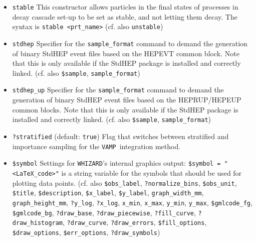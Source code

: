 \documentclass[12pt]{book}
\newcommand{\ttt}[1]{\texttt{#1}}
\newcommand{\whizard}{\texttt{WHIZARD}}
\newcommand{\vamp}{\texttt{VAMP}}
\begin{document}
\begin{itemize}
can be one of the following \ttt{eV}, \ttt{keV}, \ttt{MeV}, \ttt{GeV},
and \ttt{TeV}. If absent, \whizard\ takes \ttt{GeV} as its standard
unit. Note that this variable is absolutely mandatory for integration
and simulation of scattering processes.
\item
\ttt{stable} \newline
This constructor allows particles in the final states of processes in
decay cascade set-up to be set as stable, and not letting them
decay. The syntax is \ttt{stable <prt\_name>} (cf. also \ttt{unstable}) 
\item
\ttt{stdhep} \newline 
Specifier for the \ttt{sample\_format} command to demand the
generation of binary StdHEP event files based on the HEPEVT common
block. Note that this is only available if the StdHEP package is
installed and correctly linked. (cf. also 
\ttt{\$sample}, \ttt{sample\_format}) 
\item
\ttt{stdhep\_up} \newline 
Specifier for the \ttt{sample\_format} command to demand the
generation of binary StdHEP event files based on the HEPRUP/HEPEUP common
blocks. Note that this is only available if the StdHEP package is
installed and correctly linked. (cf. also 
\ttt{\$sample}, \ttt{sample\_format}) 
\item
\ttt{?stratified} \qquad (default: \ttt{true}) \newline
Flag that switches between stratified and importance sampling for the
\vamp\ integration method.
\item
\ttt{\$symbol} \newline
Settings for \whizard's internal graphics output: \ttt{\$symbol =
"<LaTeX\_code>"} is a string variable for the symbols that should be
used for plotting data points.  (cf. also  
\ttt{\$obs\_label}, \ttt{?normalize\_bins}, \ttt{\$obs\_unit}, 
\ttt{\$title}, \ttt{\$description}, \ttt{\$x\_label},
\ttt{\$y\_label}, \newline \ttt{graph\_width\_mm}, \ttt{graph\_height\_mm},
\ttt{?y\_log}, \ttt{?x\_log}, \ttt{x\_min}, \ttt{x\_max}, 
\ttt{y\_min}, \ttt{y\_max}, \newline \ttt{\$gmlcode\_fg}, \ttt{\$gmlcode\_bg},
\ttt{?draw\_base}, \ttt{?draw\_piecewise},
\ttt{?fill\_curve}, \newline \ttt{?draw\_histogram}, \ttt{?draw\_curve},
\ttt{?draw\_errors}, \ttt{\$fill\_options},
\ttt{\$draw\_options}, \newline \ttt{\$err\_options}, \ttt{?draw\_symbols})

\end{itemize}
\end{document}
